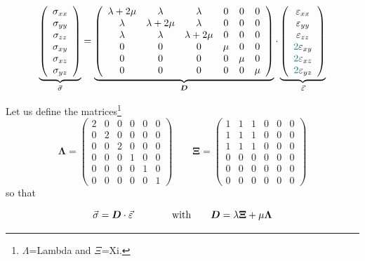 \begin{equation}
\underbrace{
\left( \begin{array}{c}
\sigma_{xx} \\
\sigma_{yy} \\
\sigma_{zz} \\
\sigma_{xy} \\
\sigma_{xz} \\
\sigma_{yz} 
\end{array} \right)}
_{\vec{\sigma}}
=
\underbrace{
\left( \begin{array}{cccccc}
\lambda+2\mu & \lambda & \lambda & 0 & 0 & 0 \\ 
\lambda & \lambda+2\mu & \lambda & 0 & 0 & 0 \\ 
\lambda & \lambda & \lambda+2\mu & 0 & 0 & 0 \\
0 & 0 & 0 & \mu & 0 & 0 \\ 
0 & 0 & 0 & 0 & \mu & 0 \\ 
0 & 0 & 0 & 0 & 0 & \mu  
\end{array} \right)}
_{{\bm D}}
\cdot
\underbrace{
\left( \begin{array}{c}
\varepsilon_{xx} \\
\varepsilon_{yy} \\
\varepsilon_{zz} \\
{\color{teal}2}\varepsilon_{xy} \\
{\color{teal}2}\varepsilon_{xz} \\
{\color{teal}2}\varepsilon_{yz} 
\end{array} \right)}
_{\vec{\varepsilon}}
\label{eq:el:vectors}
\end{equation}

Let us define the matrices\footnote{$\Lambda$=Lambda and $\Xi$=Xi.}
\[
{\bm \Lambda}=
\left(
\begin{array}{cccccc}
2 & 0 & 0 & 0 & 0 & 0 \\
0 & 2 & 0 & 0 & 0 & 0 \\
0 & 0 & 2 & 0 & 0 & 0 \\
0 & 0 & 0 & 1 & 0 & 0 \\
0 & 0 & 0 & 0 & 1 & 0 \\
0 & 0 & 0 & 0 & 0 & 1 
\end{array}
\right)
\qquad
{\bm \Xi}=
\left(
\begin{array}{cccccc}
1 & 1 & 1 & 0 & 0 & 0\\ 
1 & 1 & 1 & 0 & 0 & 0\\ 
1 & 1 & 1 & 0 & 0 & 0\\ 
0 & 0 & 0 & 0 & 0 & 0 \\
0 & 0 & 0 & 0 & 0 & 0 \\
0 & 0 & 0 & 0 & 0 & 0 
\end{array}
\right)
\]
so that 
\begin{mdframed}[backgroundcolor=blue!5]
\[
\vec\sigma = {\bm D} \cdot \vec\varepsilon \qquad\qquad
{\rm with} \qquad
{\bm D} = \lambda {\bm \Xi} + \mu {\bm \Lambda} 
\]
\end{mdframed}

